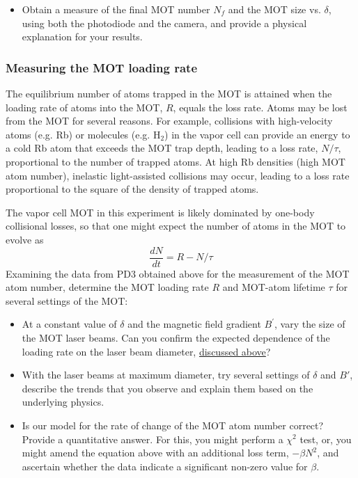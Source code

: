 \documentclass{../lab}
\begin{document}
\begin{itemize}
    \item Obtain a measure of the final MOT number $N_f$ and the MOT size vs. $\delta$, using both the photodiode and the camera, and provide a physical explanation for your results.
\end{itemize}

\subsubsection{Measuring the MOT loading rate}

The equilibrium number of atoms trapped in the MOT is attained when the loading rate of atoms into the MOT, $R $, equals the loss rate. Atoms may be lost from the MOT for several reasons. For example, collisions with high-velocity atoms (e.g. Rb) or molecules (e.g. H$_2$) in the vapor cell can provide an energy to a cold Rb atom that exceeds the MOT trap depth, leading to a loss rate, $N / \tau$, proportional to the number of trapped atoms. At high Rb densities (high MOT atom number), inelastic light-assisted collisions may occur, leading to a loss rate proportional to the square of the density of trapped atoms.

The vapor cell MOT in this experiment is likely dominated by one-body collisional losses, so that one might expect the number of atoms in the MOT to evolve as
\begin{equation}
    \frac{d N}{dt} = R -  N / \tau
\end{equation}
Examining the data from PD3 obtained above for the measurement of the MOT atom number, determine the MOT loading rate $ R $ and MOT-atom lifetime $\tau$ for several settings of the MOT:

\begin{itemize}
    \item At a constant value of $\delta$ and the magnetic field gradient $B^\prime $, vary the size of the MOT laser beams. Can you confirm the expected dependence of the loading rate on the laser beam diameter, \hyperref[subsubsec:CaptureVelocity]{discussed above}?

    \item With the laser beams at maximum diameter, try several settings of $\delta$ and $B'$, describe the trends that you observe and explain them based on the underlying physics.

    \item Is our model for the rate of change of the MOT atom number correct? Provide a quantitative answer. For this, you might perform a $\chi^2$ test, or, you might amend the equation above with an additional loss term, $- \beta N^2$, and ascertain whether the data indicate a significant non-zero value for $\beta$.
\end{itemize}
\end{document}
